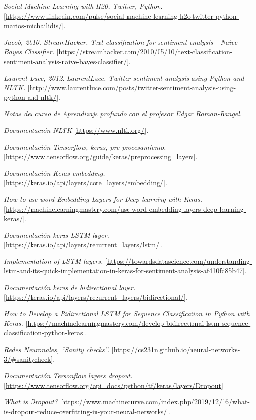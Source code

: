 \documentclass[sigconf, nonacm, spanish]{acmart}
\begin{document}
\begin{thebibliography}{3}

\textit{Social Machine Learning with H20, Twitter, Python.}
[\url{https://www.linkedin.com/pulse/social-machine-learning-h2o-twitter-python-marios-michailidis/}].

\textit{Jacob, 2010. StreamHacker. Text classification for sentiment analysis - Naive Bayes Classifier.}
[\url{https://streamhacker.com/2010/05/10/text-classification-sentiment-analysis-naive-bayes-classifier/}].

\textit{Laurent Luce, 2012. LaurentLuce. Twitter sentiment analysis using Python and NLTK.}
[\url{http://www.laurentluce.com/posts/twitter-sentiment-analysis-using-python-and-nltk/}].

\textit{Notas del curso de Aprendizaje profundo con el profesor Edgar Roman-Rangel.}

\textit{Documentación NLTK}
[\url{https://www.nltk.org/}].

\textit{Documentación Tensorflow, keras, pre-procesamiento.}
[\url{https://www.tensorflow.org/guide/keras/preprocessing_layers}].

\textit{Documentación Keras embedding.}
[\url{https://keras.io/api/layers/core_layers/embedding/}].

\textit{How to use word Embedding Layers for Deep learning with Keras.}
[\url{https://machinelearningmastery.com/use-word-embedding-layers-deep-learning-keras/}].

\textit{Documentación keras LSTM layer.}
[\url{https://keras.io/api/layers/recurrent_layers/lstm/}].


\textit{Implementation of LSTM layers.}
[\url{https://towardsdatascience.com/understanding-lstm-and-its-quick-implementation-in-keras-for-sentiment-analysis-af410fd85b47}].

\textit{Documentación keras de bidirectional layer.}
[\url{https://keras.io/api/layers/recurrent_layers/bidirectional/}].

\textit{How to Develop a Bidirectional LSTM for Sequence Classification in Python with Keras.}
[\url{https://machinelearningmastery.com/develop-bidirectional-lstm-sequence-classification-python-keras}].

\textit{Redes Neuronales, ``Sanity checks''.}
[\url{https://cs231n.github.io/neural-networks-3/#sanitycheck}].

\textit{Documentación Tersonflow layers dropout.}
[\url{https://www.tensorflow.org/api_docs/python/tf/keras/layers/Dropout}].

\textit{What is Dropout?}
[\url{https://www.machinecurve.com/index.php/2019/12/16/what-is-dropout-reduce-overfitting-in-your-neural-networks/}].

\end{thebibliography}
\end{document}
